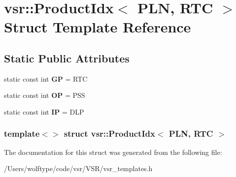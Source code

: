 \hypertarget{structvsr_1_1_product_idx_3_01_p_l_n_00_01_r_t_c_01_4}{\section{vsr\-:\-:Product\-Idx$<$ P\-L\-N, R\-T\-C $>$ Struct Template Reference}
\label{structvsr_1_1_product_idx_3_01_p_l_n_00_01_r_t_c_01_4}
}
\subsection*{Static Public Attributes}
\begin{DoxyCompactItemize}
\item 
\hypertarget{structvsr_1_1_product_idx_3_01_p_l_n_00_01_r_t_c_01_4_aa41eb5a2af0061b262a73721750caa85}{static const int {\bfseries G\-P} = R\-T\-C}\label{structvsr_1_1_product_idx_3_01_p_l_n_00_01_r_t_c_01_4_aa41eb5a2af0061b262a73721750caa85}

\item 
\hypertarget{structvsr_1_1_product_idx_3_01_p_l_n_00_01_r_t_c_01_4_ac789b750aebcf5a08192353f8113dd2e}{static const int {\bfseries O\-P} = P\-S\-S}\label{structvsr_1_1_product_idx_3_01_p_l_n_00_01_r_t_c_01_4_ac789b750aebcf5a08192353f8113dd2e}

\item 
\hypertarget{structvsr_1_1_product_idx_3_01_p_l_n_00_01_r_t_c_01_4_a1eb807631bb6ea2aa9eb4604dbd776b1}{static const int {\bfseries I\-P} = D\-L\-P}\label{structvsr_1_1_product_idx_3_01_p_l_n_00_01_r_t_c_01_4_a1eb807631bb6ea2aa9eb4604dbd776b1}

\end{DoxyCompactItemize}
\subsubsection*{template$<$$>$ struct vsr\-::\-Product\-Idx$<$ P\-L\-N, R\-T\-C $>$}



The documentation for this struct was generated from the following file\-:\begin{DoxyCompactItemize}
\item 
/\-Users/wolftype/code/vsr/\-V\-S\-R/vsr\-\_\-templates.\-h\end{DoxyCompactItemize}
